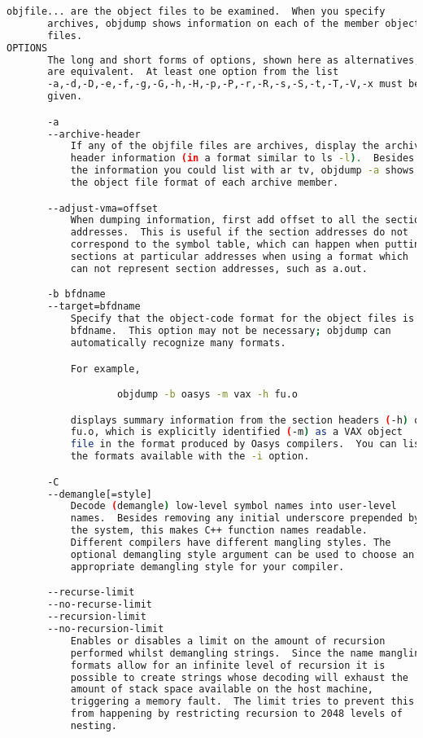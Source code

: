 {{\begin{lstlisting}[language=bash]
       objfile... are the object files to be examined.  When you specify
       archives, objdump shows information on each of the member object
       files.
OPTIONS
       The long and short forms of options, shown here as alternatives,
       are equivalent.  At least one option from the list
       -a,-d,-D,-e,-f,-g,-G,-h,-H,-p,-P,-r,-R,-s,-S,-t,-T,-V,-x must be
       given.

       -a
       --archive-header
           If any of the objfile files are archives, display the archive
           header information (in a format similar to ls -l).  Besides
           the information you could list with ar tv, objdump -a shows
           the object file format of each archive member.

       --adjust-vma=offset
           When dumping information, first add offset to all the section
           addresses.  This is useful if the section addresses do not
           correspond to the symbol table, which can happen when putting
           sections at particular addresses when using a format which
           can not represent section addresses, such as a.out.

       -b bfdname
       --target=bfdname
           Specify that the object-code format for the object files is
           bfdname.  This option may not be necessary; objdump can
           automatically recognize many formats.

           For example,

                   objdump -b oasys -m vax -h fu.o

           displays summary information from the section headers (-h) of
           fu.o, which is explicitly identified (-m) as a VAX object
           file in the format produced by Oasys compilers.  You can list
           the formats available with the -i option.

       -C
       --demangle[=style]
           Decode (demangle) low-level symbol names into user-level
           names.  Besides removing any initial underscore prepended by
           the system, this makes C++ function names readable.
           Different compilers have different mangling styles. The
           optional demangling style argument can be used to choose an
           appropriate demangling style for your compiler.

       --recurse-limit
       --no-recurse-limit
       --recursion-limit
       --no-recursion-limit
           Enables or disables a limit on the amount of recursion
           performed whilst demangling strings.  Since the name mangling
           formats allow for an infinite level of recursion it is
           possible to create strings whose decoding will exhaust the
           amount of stack space available on the host machine,
           triggering a memory fault.  The limit tries to prevent this
           from happening by restricting recursion to 2048 levels of
           nesting.


\end{lstlisting}}}
